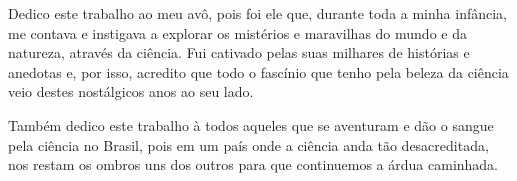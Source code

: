 
Dedico este trabalho ao meu avô, pois foi ele que, durante toda a minha infância, me contava e instigava a explorar os mistérios e maravilhas do mundo e da natureza, através da ciência. Fui cativado pelas suas milhares de histórias e anedotas e, por isso, acredito que todo o fascínio que tenho pela beleza da ciência veio destes nostálgicos anos ao seu lado.

Também dedico este trabalho à todos aqueles que se aventuram e dão o sangue pela ciência no Brasil, pois em um país onde a ciência anda tão desacreditada, nos restam os ombros uns dos outros para que continuemos a árdua caminhada.